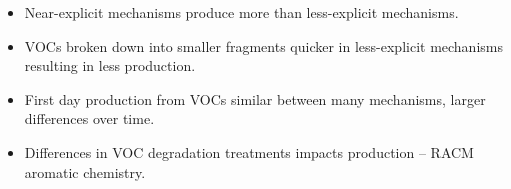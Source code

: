 \begin{BlueBox}
    \vskip-1cm
    \begin{block}{}
        \begin{itemize}
            \item Near-explicit mechanisms produce more  than less-explicit mechanisms. \vspace{10mm}
            \item VOCs broken down into smaller fragments quicker in less-explicit mechanisms resulting in less  production. \vspace{10mm} 
            \item First day  production from VOCs similar between many mechanisms, larger differences over time. \vspace{10mm}
            \item Differences in VOC degradation treatments impacts  production -- RACM aromatic chemistry. \vspace{10mm}
        \end{itemize}        
    \end{block}
\end{BlueBox}
